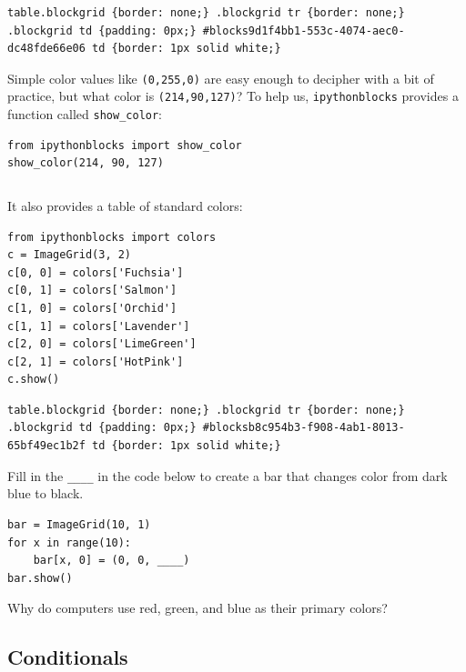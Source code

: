 \documentclass{book}
\begin{document}
\begin{verbatim}
table.blockgrid {border: none;} .blockgrid tr {border: none;} .blockgrid td {padding: 0px;} #blocks9d1f4bb1-553c-4074-aec0-dc48fde66e06 td {border: 1px solid white;}
\end{verbatim}

Simple color values like \texttt{(0,255,0)} are easy enough to decipher
with a bit of practice, but what color is \texttt{(214,90,127)}? To help
us, \texttt{ipythonblocks} provides a function called
\texttt{show\_color}:

\begin{verbatim}
from ipythonblocks import show_color
show_color(214, 90, 127)
\end{verbatim}

\begin{verbatim}
\end{verbatim}

It also provides a table of standard colors:

\begin{verbatim}
from ipythonblocks import colors
c = ImageGrid(3, 2)
c[0, 0] = colors['Fuchsia']
c[0, 1] = colors['Salmon']
c[1, 0] = colors['Orchid']
c[1, 1] = colors['Lavender']
c[2, 0] = colors['LimeGreen']
c[2, 1] = colors['HotPink']
c.show()
\end{verbatim}

\begin{verbatim}
table.blockgrid {border: none;} .blockgrid tr {border: none;} .blockgrid td {padding: 0px;} #blocksb8c954b3-f908-4ab1-8013-65bf49ec1b2f td {border: 1px solid white;}
\end{verbatim}

\begin{challenge}
  Fill in the \texttt{\_\_\_\_} in the code below to create a bar that
  changes color from dark blue to black.

\begin{verbatim}
bar = ImageGrid(10, 1)
for x in range(10):
    bar[x, 0] = (0, 0, ____)
bar.show()
\end{verbatim}
\end{challenge}

\begin{challenge}
  Why do computers use red, green, and blue as their primary colors?
\end{challenge}

\subsection{Conditionals}
\end{document}
